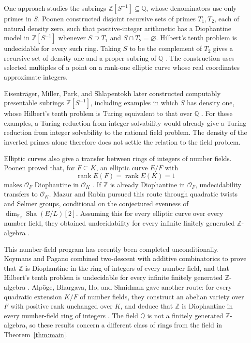 One approach studies the subrings
\(\mathbb Z[S^{-1}]\subseteq\mathbb Q\), whose denominators use only
primes in \(S\).  Poonen constructed disjoint recursive sets of primes
\(T_1,T_2\), each of natural density zero, such that positive-integer
arithmetic has a Diophantine model in \(\mathbb Z[S^{-1}]\) whenever
\(S\supseteq T_1\) and \(S\cap T_2=\varnothing\).  Hilbert's tenth
problem is undecidable for every such ring.  Taking \(S\) to be the
complement of \(T_2\) gives a recursive set of density one and a
proper subring of \(\mathbb Q\)
\cite[Theorem~1.3]{PoonenSubrings}.  The construction uses selected
multiples of a point on a rank-one elliptic curve whose real
coordinates approximate integers.  

Eisenträger, Miller, Park, and Shlapentokh later constructed
computably presentable subrings \(\mathbb Z[S^{-1}]\), including
examples in which \(S\) has density one, whose Hilbert's tenth problem
is Turing equivalent to that over \(\mathbb Q\)
\cite[Theorem~3.17]{EisentragerMillerParkShlapentokh2017}.  For these
examples, a Turing reduction from integer solvability would already
give a Turing reduction from integer solvability to the rational
field problem.  The density of the
inverted primes alone therefore does not settle the relation to the
field problem.

Elliptic curves also give a transfer between rings of integers of
number fields.  Poonen proved that, for \(F\subseteq K\), an elliptic
curve \(E/F\) with
\[
             \operatorname{rank}E(F)=\operatorname{rank}E(K)=1
\]
makes \(\mathcal O_F\) Diophantine in \(\mathcal O_K\)
\cite[Theorem~1]{PoonenRankOne2002}.  If \(\mathbb Z\) is already
Diophantine in \(\mathcal O_F\), undecidability transfers to
\(\mathcal O_K\).  Mazur and Rubin pursued this route through
quadratic twists and Selmer groups, conditional on the conjectured
evenness of \(\dim_{\mathbb F_2}\operatorname{Sha}(E/L)[2]\).
Assuming this for every elliptic curve over every number field, they obtained undecidability for
every infinite finitely generated \(\mathbb Z\)-algebra
\cite[Theorem~1.13, Corollary~1.14, and Theorem~8.1]{MazurRubin2010}.

This number-field program has recently been completed
unconditionally.  Koymans and Pagano combined two-descent with
additive combinatorics to prove that \(\mathbb Z\) is Diophantine in
the ring of integers of every number field, and that Hilbert's tenth
problem is undecidable for every infinite finitely generated
\(\mathbb Z\)-algebra \cite{KoymansPagano2026}.
Alpöge, Bhargava, Ho, and Shnidman
gave another route: for every quadratic extension \(K/F\) of number fields, they
construct an abelian variety over \(F\) with positive rank unchanged
over \(K\), and deduce that \(\mathbb Z\) is Diophantine in every
number-field ring of integers
\cite[Theorem~1.1 and Corollary~1.2]{AlpogeBhargavaHoShnidman2026}.
The field \(\mathbb Q\) is not a finitely generated
\(\mathbb Z\)-algebra, so these results concern a different class of
rings from the field in Theorem~\ref{thm:main}.

